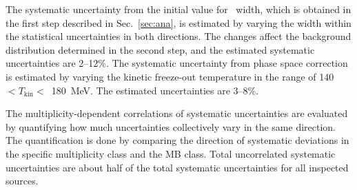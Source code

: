 The systematic uncertainty from the initial value for \fzero~width, which is obtained in the first step described in Sec.~\ref{sec:ana}, is estimated by varying the width within the statistical uncertainties in both directions. The changes affect the background distribution determined in the second step, and the estimated systematic uncertainties are 2--12\%. The systematic uncertainty from phase space correction is estimated by varying the kinetic freeze-out temperature in the range of 140~$<T_{\mathrm{kin}}<$~180~MeV. The estimated uncertainties are 3--8\%. 

The multiplicity-dependent correlations of systematic uncertainties are evaluated by quantifying how much uncertainties collectively vary in the same direction. The quantification is done by comparing the direction of systematic deviations in the specific multiplicity class and the MB class. Total uncorrelated systematic uncertainties are about half of the total systematic uncertainties for all inspected sources.




